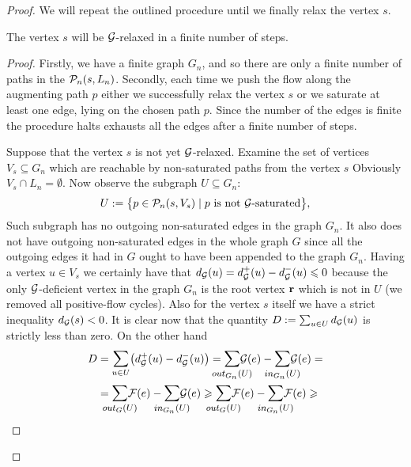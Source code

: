 \documentclass[12pt]{article}
\begin{document}
\begin{proof}
      We will repeat the outlined procedure until we finally relax the vertex $s$.
      \begin{prop}
        The vertex $s$ will be $\cal{G}$-relaxed in a finite number of steps.
      \end{prop}
      \begin{proof}
        Firstly, we have a finite graph $G_{n}$, and so there are only a finite number of paths in the $\gnpaths(s, L_n)$.
        Secondly, each time we push the flow along the augmenting path $p$ either we successfully relax the vertex $s$
          or we saturate at least one edge, lying on the chosen path $p$.
        Since the number of the edges is finite the procedure halts exhausts all the edges after a finite number of steps.

        Suppose that the vertex $s$ is not yet $\cal{G}$-relaxed.
        Examine the set of vertices $V_s \subseteq G_n$ which are reachable by non-saturated paths from the vertex $s$
        Obviously $V_s \cap L_n = \emptyset$.
        Now observe the subgraph $U \subseteq G_n$:
        \[
          U := \big\{p \in \gnpaths(s, V_s) \mid \text{$p$ is not $\cal{G}$-saturated}\big\},
        \]
        Such subgraph has no outgoing non-saturated edges in the graph $G_n$.
        It also does not have outgoing non-saturated edges in the whole graph $G$ since all the outgoing edges it had in $G$
          ought to have been appended to the graph $G_n$.
        Having a vertex $u \in V_s$ we certainly have that $d_{\cal{G}}(u) = d^{+}_{\cal{G}}(u) - d^{-}_{\cal{G}}(u) \leq 0$ because
          the only $\cal{G}$-deficient vertex in the graph $G_n$ is the root vertex $\root$ which is not in $U$ (we removed all positive-flow
          cycles).
        Also for the vertex $s$ itself we have a strict inequality $d_{\cal{G}}(s) < 0$.
        It is clear now that the quantity $D := \sum_{u \in U} d_{\cal{G}}(u)$ is strictly less than zero.
        On the other hand
        \[
        \begin{split}
          D &= \mathlarger\sum_{u \in U} \big(d^{+}_{\cal{G}}(u) - d^{-}_{\cal{G}}(u)\big)
          = \mathlarger{\smashoperator{\sum_{\eout_{G_n}(U)}}} \cal{G}(e) - \mathlarger{\smashoperator{\sum_{\ein_{G_n}(U)}}} \cal{G}(e) = \\
          &= \mathlarger{\smashoperator{\sum_{\eout_{G}(U)}}} \flowpos(e) - \mathlarger{\smashoperator{\sum_{\ein_{G_n}(U)}}} \cal{G}(e)
            \geq \mathlarger{\smashoperator{\sum_{\eout_G(U)}}} \flowpos(e) - \mathlarger{\smashoperator{\sum_{\ein_{G_n}(U)}}} \flowpos(e) \geq \\

\end{split}\]
\end{proof}
\end{proof}
\end{document}
